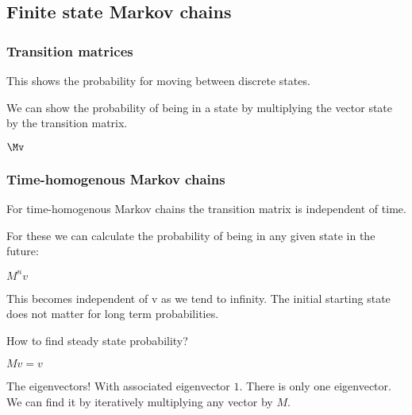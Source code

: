 
\subsection{Finite state Markov chains}

\subsubsection{Transition matrices}

This shows the probability for moving between discrete states.

We can show the probability of being in a state by multiplying the vector state by the transition matrix.

\(\Mv\)

\subsubsection{Time-homogenous Markov chains}

For time-homogenous Markov chains the transition matrix is independent of time.

For these we can calculate the probability of being in any given state in the future:

\(M^nv\)

This becomes independent of v as we tend to infinity. The initial starting state does not matter for long term probabilities.

How to find steady state probability?

\(Mv=v\)

The eigenvectors! With associated eigenvector \(1\). There is only one eigenvector. We can find it by iteratively multiplying any vector by \(M\).

